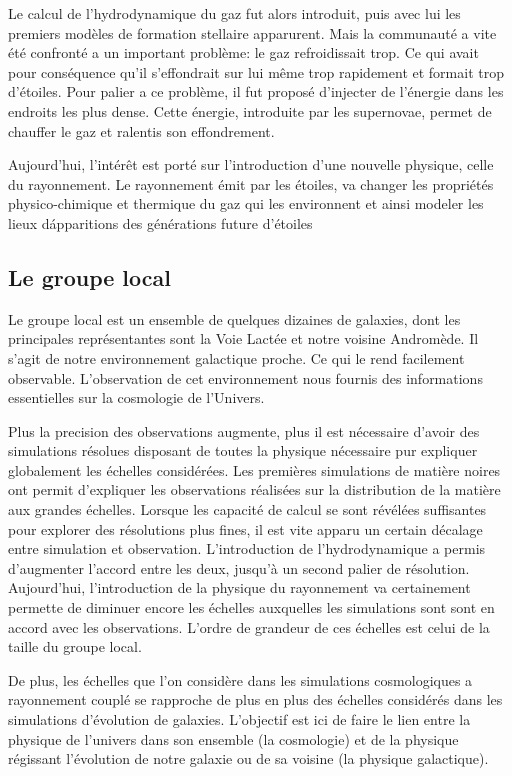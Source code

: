 Le calcul de l'hydrodynamique du gaz fut alors introduit, puis avec lui les premiers modèles de formation stellaire apparurent.
Mais la communauté a vite été confronté a un important problème: le gaz refroidissait trop.
Ce qui avait pour conséquence qu'il s'effondrait sur lui même trop rapidement et formait trop d'étoiles.
Pour palier a ce problème, il fut proposé d'injecter de l'énergie dans les endroits les plus dense.
Cette énergie, introduite par les supernovae, permet de chauffer le gaz et ralentis son effondrement. 

Aujourd'hui, l'intérêt est porté sur l'introduction d'une nouvelle physique, celle du rayonnement.
Le rayonnement émit par les étoiles, va changer les propriétés physico-chimique et thermique du gaz qui les environnent et ainsi modeler les lieux d\'apparitions des générations future d'étoiles


\subsection*{Le groupe local}
Le groupe local est un ensemble de quelques dizaines de galaxies, dont les principales représentantes sont la Voie Lactée et notre voisine Andromède.
Il s'agit de notre environnement galactique proche.
Ce qui le rend facilement observable.
L'observation de cet environnement nous fournis des informations essentielles sur la cosmologie de l'Univers.

Plus la precision des observations augmente, plus il est nécessaire d'avoir des simulations résolues disposant de toutes la physique nécessaire pur expliquer globalement les échelles considérées.
Les premières simulations de matière noires ont permit d'expliquer les observations réalisées sur la distribution de la matière aux grandes échelles.
Lorsque les capacité de calcul se sont révélées suffisantes pour explorer des résolutions plus fines, il est vite apparu un certain décalage entre simulation et observation. 
L'introduction de l'hydrodynamique a permis d'augmenter l'accord entre les deux, jusqu'à un second palier de résolution.
Aujourd'hui, l'introduction de la physique du rayonnement va certainement permette de diminuer encore les échelles auxquelles les simulations sont sont en accord avec les observations.
L'ordre de grandeur de ces échelles est celui de la taille du groupe local.

De plus, les échelles que l'on considère dans les simulations cosmologiques a rayonnement couplé se rapproche de plus en plus des échelles considérés dans les simulations d'évolution de galaxies.
L'objectif est ici de faire le lien entre la physique de l'univers dans son ensemble (la cosmologie) et de la physique régissant l'évolution de notre galaxie ou de sa voisine (la physique galactique).



